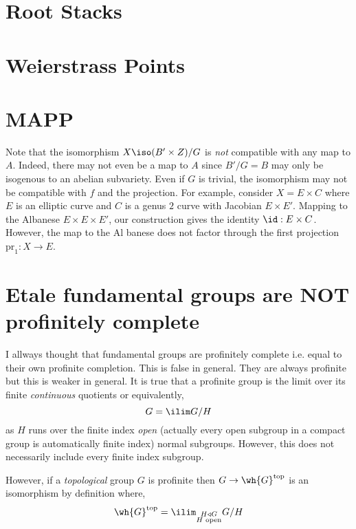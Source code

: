 \documentclass[12pt]{article}
\newcommand{\pr}{\mathrm{pr}}
\begin{document}
\section{Root Stacks}

\section{Weierstrass Points}



\section{MAPP}

\begin{remark}
Note that the isomorphism $X \iso (B' \times Z)/G$ is \textit{not} compatible with any map to $A$. Indeed, there may not even be a map to $A$ since $B'/G = B$ may only be isogenous to an abelian subvariety. Even if $G$ is trivial, the isomorphism may not be compatible with $f$ and the projection. For example, consider $X = E \times C$ where $E$ is an elliptic curve and $C$ is a genus $2$ curve with Jacobian $E \times E'$. Mapping to the Albanese $E \times E \times E'$, our construction gives the identity $\id : E \times C$. However, the map to the Al banese does not factor through the first projection $\pr_1 : X \to E$. 
\end{remark}


\section{Etale fundamental groups are NOT profinitely complete}

I allways thought that \etale fundamental groups are profinitely complete i.e. equal to their own profinite completion. This is false in general. They are always profinite but this is weaker in general. It is true that a profinite group is the limit over its finite \textit{continuous} quotients or equivalently,
\[ G = \ilim G/H \]
as $H$ runs over the finite index \textit{open} (actually every open subgroup in a compact group is automatically finite index) normal subgroups. However, this does not necessarily include every finite index subgroup.

\begin{rmk}
However, if a \textit{topological} group $G$ is profinite then $G \to \wh{G}^{\text{top}}$ is an isomorphism by definition where,
\[ \wh{G}^{\text{top}} = \ilim_{\substack{H \triangleleft G \\ H \text{ open}}} G/H \]
\end{rmk}
\end{document}
